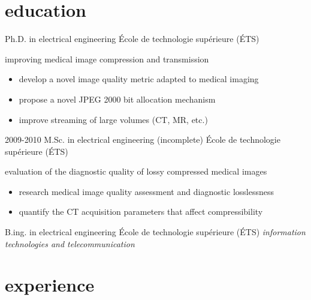 \documentclass[print]{friggeri-cv}
\begin{document}


\section{education}
\begin{entrylist}
  {Ph.D. in electrical engineering} 
  {École de technologie supérieure {\scriptsize (ÉTS)}}
  {improving medical image compression and transmission
  \begin{itemize}
    \item develop a novel image quality metric adapted to medical imaging
    \item propose a novel {\footnotesize JPEG 2000} bit allocation mechanism
    \item improve streaming of large volumes ({\footnotesize CT}, {\footnotesize MR}, etc.)
  \end{itemize}}

  \entry
  {2009-2010}
  {M.Sc. in electrical engineering (incomplete\textsuperscript{\tiny\textdaggerdbl})}
  {École de technologie supérieure {\scriptsize (ÉTS)}}
  {evaluation of the diagnostic quality of lossy compressed medical images
  \begin{itemize}
    \item research medical image quality assessment and diagnostic losslessness
    \item quantify the {\footnotesize CT} acquisition parameters that affect compressibility
  \end{itemize}}

   {B.ing. in electrical engineering}
  {École de technologie supérieure {\scriptsize (ÉTS)}}
  {\emph{information technologies and telecommunication}}

\end{entrylist}


\section{experience}
\end{document}
